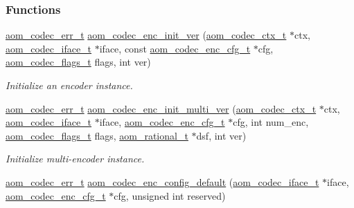 \subsubsection*{Functions}
\begin{DoxyCompactItemize}
\item 
\hyperlink{group__codec_gaaae61e0f8663e6137f1e228757248e7c}{aom\+\_\+codec\+\_\+err\+\_\+t} \hyperlink{group__encoder_ga205cf6f9460f4b4a842872012ef6fb0c}{aom\+\_\+codec\+\_\+enc\+\_\+init\+\_\+ver} (\hyperlink{group__codec_ga9a1d27f9742d9f70783e3c6cb849b5b4}{aom\+\_\+codec\+\_\+ctx\+\_\+t} $\ast$ctx, \hyperlink{group__codec_ga4ef55b44c762836d1550e11921bed403}{aom\+\_\+codec\+\_\+iface\+\_\+t} $\ast$iface, const \hyperlink{group__encoder_gab9627d5dcf858b7e755a5fc4a879e451}{aom\+\_\+codec\+\_\+enc\+\_\+cfg\+\_\+t} $\ast$cfg, \hyperlink{group__codec_ga18f2242c1afca329581fbd3f2c81721b}{aom\+\_\+codec\+\_\+flags\+\_\+t} flags, int ver)
\begin{DoxyCompactList}\small\item\em Initialize an encoder instance. \end{DoxyCompactList}\item 
\hyperlink{group__codec_gaaae61e0f8663e6137f1e228757248e7c}{aom\+\_\+codec\+\_\+err\+\_\+t} \hyperlink{group__encoder_gad3dfb2298402298abadb2c1b059b5f0b}{aom\+\_\+codec\+\_\+enc\+\_\+init\+\_\+multi\+\_\+ver} (\hyperlink{group__codec_ga9a1d27f9742d9f70783e3c6cb849b5b4}{aom\+\_\+codec\+\_\+ctx\+\_\+t} $\ast$ctx, \hyperlink{group__codec_ga4ef55b44c762836d1550e11921bed403}{aom\+\_\+codec\+\_\+iface\+\_\+t} $\ast$iface, \hyperlink{group__encoder_gab9627d5dcf858b7e755a5fc4a879e451}{aom\+\_\+codec\+\_\+enc\+\_\+cfg\+\_\+t} $\ast$cfg, int num\+\_\+enc, \hyperlink{group__codec_ga18f2242c1afca329581fbd3f2c81721b}{aom\+\_\+codec\+\_\+flags\+\_\+t} flags, \hyperlink{group__encoder_ga89310b75f722a6f3ee5e88d9b0f5853f}{aom\+\_\+rational\+\_\+t} $\ast$dsf, int ver)
\begin{DoxyCompactList}\small\item\em Initialize multi-\/encoder instance. \end{DoxyCompactList}\item 
\hyperlink{group__codec_gaaae61e0f8663e6137f1e228757248e7c}{aom\+\_\+codec\+\_\+err\+\_\+t} \hyperlink{group__encoder_gabe456ab6f99bdebc47018779b75d2521}{aom\+\_\+codec\+\_\+enc\+\_\+config\+\_\+default} (\hyperlink{group__codec_ga4ef55b44c762836d1550e11921bed403}{aom\+\_\+codec\+\_\+iface\+\_\+t} $\ast$iface, \hyperlink{group__encoder_gab9627d5dcf858b7e755a5fc4a879e451}{aom\+\_\+codec\+\_\+enc\+\_\+cfg\+\_\+t} $\ast$cfg, unsigned int reserved)

\end{DoxyCompactItemize}
